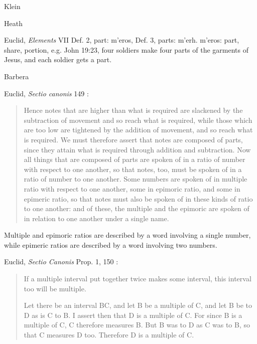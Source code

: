 \documentclass{article}
\newcommand{\textgreek}[1]{\begingroup\fontencoding{LGR}\selectfont#1\endgroup}
\theoremstyle{definition}
\begin{document}
Klein \cite{klein}











Heath \cite{euclidII}

Euclid, {\em Elements} VII Def. 2, part: \textgreek{m'eros}, Def. 3, parts: \textgreek{m'erh}.
\textgreek{m'eros}: part, share, portion, e.g. John 19:23, four soldiers make four parts of the garments of Jesus,
and each soldier gets a part.















Barbera \cite{barbera}

Euclid, {\em Sectio canonis} 149 \cite[p.~192]{barker}:

\begin{quote}
Hence notes
that are higher than what is required are slackened by the subtraction of
movement and so reach what is required, while those which are too low are
tightened by the addition of movement, and so reach what is required. We
must therefore assert that notes are composed of parts, since they attain what
is required through addition and subtraction. Now all things that are composed
of parts are spoken of in a ratio of number with respect to one another, so that
notes, too, must be spoken of in a ratio of number to one another. Some
numbers are spoken of in multiple ratio with respect to one another, some in
epimoric ratio, and some in epimeric ratio, so that notes must also be spoken
of in these kinds of ratio to one another:  and of these, the multiple and the
epimoric are spoken of in relation to one another under a single name.
\end{quote}

Multiple and epimoric ratios are described by a word involving a single number, while epimeric
ratios are described by a word involving two numbers.

Euclid, {\em Sectio Canonis} Prop. 1, 150 \cite[p.~194]{barker}:

\begin{quote}
If a multiple interval put together twice makes some
interval, this interval too will be multiple.

Let there be an interval BC, and let B be a multiple of C,
and let B be to D as is C to B. I assert then that D is a
multiple of C. For since B is a multiple of C, C therefore
measures B. But B was to D as C was to B, so that C
measures D too. Therefore D is a multiple of C.
\end{quote}
\end{document}
